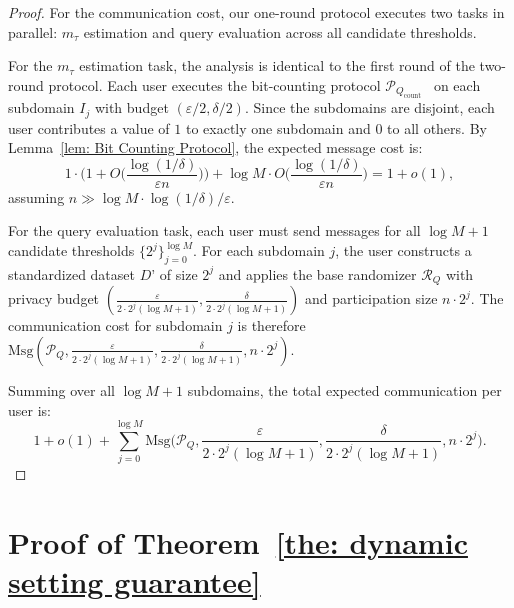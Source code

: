 \begin{proof}
For the communication cost, our one-round protocol executes two tasks in parallel: $m_\tau$ estimation and query evaluation across all candidate thresholds.

For the $m_\tau$ estimation task, the analysis is identical to the first round of the two-round protocol. Each user executes the bit-counting protocol $\mathcal{P}_{Q_\text{count}}$~\cite{ghazi2021differentially} on each subdomain $I_j$ with budget $(\varepsilon/2, \delta/2)$. Since the subdomains are disjoint, each user contributes a value of $1$ to exactly one subdomain and $0$ to all others. By Lemma~\ref{lem: Bit Counting Protocol}, the expected message cost is:
\[
1 \cdot \Big(1 + O\big(\frac{\log(1/\delta)}{\varepsilon n}\big)\Big) + \log M \cdot O\big(\frac{\log(1/\delta)}{\varepsilon n}\big) = 1 + o(1),
\]
assuming $n \gg \log M \cdot \log(1/\delta)/\varepsilon$.

For the query evaluation task, each user must send messages for all $\log M + 1$ candidate thresholds $\{2^j\}_{j=0}^{\log M}$. For each subdomain $j$, the user constructs a standardized dataset $D’$ of size $2^j$ and applies the base randomizer $\mathcal{R}_Q$ with privacy budget $(\frac{\varepsilon}{2 \cdot 2^j (\log M+1)}, \frac{\delta}{2 \cdot 2^j (\log M+1)})$ and participation size $n \cdot 2^j$. The communication cost for subdomain $j$ is therefore $\mathrm{Msg}(\mathcal{P}_Q, \frac{\varepsilon}{2\cdot 2^j(\log M+1)}, \frac{\delta}{2\cdot 2^j(\log M+1)}, n \cdot 2^j)$.

Summing over all $\log M + 1$ subdomains, the total expected communication per user is:
\[
1 + o(1) + \sum_{j=0}^{\log M} \mathrm{Msg}\Big(\mathcal{P}_Q, \frac{\varepsilon}{2\cdot 2^j(\log M+1)}, \frac{\delta}{2\cdot 2^j(\log M+1)}, n \cdot 2^j\Big).
\]

\end{proof}

   
\section{Proof of Theorem~\ref{the: dynamic setting guarantee}}

